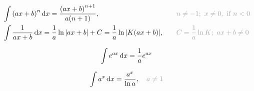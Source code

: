 %
\begin{HackEquationLeftAlign}
\begin{alignat*}{2}
    &\int{\parens*{ax + b}^n \,\diff{x}} = \frac{\parens*{ax + b}^{n+1}}{a \parens*{n+1}}
        ,\quad
        &&{\color{extranotecolor}
            n \neq -1
            ;\ x \neq 0
            ,\ \text{if } n < 0
        }
        \\
    &\int{\frac{1}{ax + b} \,\diff{x}} = \frac{1}{a} \ln{\abs{ax + b}} + C
        = \frac{1}{a} \ln{\abs{K(ax + b)}}
        ,\quad
        &&{\color{extranotecolor}
            C = \frac{1}{a} \ln{K}
            ;\ ax + b \ne 0
        }
\end{alignat*}
\end{HackEquationLeftAlign}%


\vspace*{-\parskip} %
\begin{myminipage}[t]{0.5\linewidth}
    \begin{HackEquationLeftAlign}
    \begin{equation*}
        \int{e^{ax} \,\ensuremath{\mathrm{d}x}} = \frac{1}{a} e^{ax}
    \end{equation*}
    \end{HackEquationLeftAlign}%
\end{myminipage}%
\begin{myminipage}[t]{0.5\linewidth}
    \begin{HackEquationLeftAlign}
    \begin{equation*}
        \int{a^x \,\diff{x}}
            = \frac{a^x}{\ln{a}}
            ,\quad
            {\color{extranotecolor}
                a \neq 1
            }
    \end{equation*}
    \end{HackEquationLeftAlign}%
\end{myminipage}%



